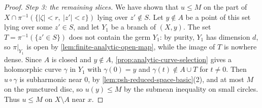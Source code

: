 \begin{proof}
\emph{Step 3: the remaining slices.} We have shown that $u\leq M$ on the part of $X\cap\pi^{-1}(\{|\zeta|<r,\ |z'|<\varepsilon\})$ lying over $z'\notin S$. Let $y\notin A$ be a point of this set lying over some $z'\in S$, and let $Y_1$ be a branch of $(X,y)$. The set $T=\pi^{-1}(\{z'\in S\})$ does not contain the germ $Y_1$: by purity, $Y_1$ has dimension $d$, so $\pi|_{Y_1}$ is open by \cref{lem:finite-analytic-open-map}, while the image of $T$ is nowhere dense. Since $A$ is closed and $y\notin A$, \cref{prop:analytic-curve-selection} gives a holomorphic curve $\gamma$ in $Y_1$ with $\gamma(0)=y$ and $\gamma(t)\notin A\cup T$ for $t\neq0$. Then $u\circ\gamma$ is subharmonic near $0$, by \cref{lem:psh-reduced-space-basic}(2), and at most $M$ on the punctured disc, so $u(y)\leq M$ by the submean inequality on small circles. Thus $u\leq M$ on $X\setminus A$ near $x$.
\end{proof}
